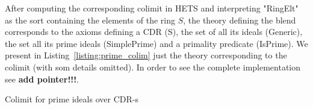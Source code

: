 After computing the corresponding colimit in HETS and interpreting
"RingElt" as the sort containing the elements of the ring $S$, the
theory defining the blend corresponds to the axioms defining a CDR
(S), the set of all its ideals (Generic), the set all its prime ideals
(SimplePrime) and a primality predicate (IsPrime).  We present 
in Listing~\ref{listing:prime_colim}
just the theory corresponding to the colimit (with som details
omitted). In order to see the
complete implementation see \textbf{add pointer!!!}.

% 
  \begin{listing}[!ht]
    \begin{mdframed}
     \begin{footnotesize}
      
    \end{footnotesize}
  \end{mdframed}
    \caption{Colimit for prime ideals over CDR-s}
    \label{listing:prime_colim}
  \end{listing}



